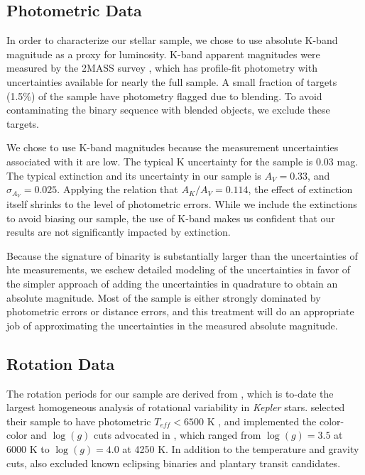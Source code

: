 \documentclass[manuscript]{aastex6}
\newcommand{\Kepler}{\mbox{\textit{Kepler}}}
\newcommand{\Teff}{\ensuremath{T_{eff}}}
\newcommand{\logg}{\ensuremath{\log(g)}}
\begin{document}
\subsection{Photometric Data}

In order to characterize our stellar sample, we chose to use absolute K-band
magnitude as a proxy for luminosity. K-band apparent magnitudes were measured
by the 2MASS survey \citep{Skrutskie06}, which has profile-fit photometry with 
uncertainties available for nearly the full sample. A small fraction of 
targets (1.5\%) of the \citet{McQuillan14} sample have photometry flagged due
to blending. To avoid contaminating the binary sequence with blended objects,
we exclude these targets.

We chose to use K-band magnitudes because the measurement uncertainties
associated with it are low. The typical K uncertainty for the
\citep{McQuillan14} sample is 0.03 mag. The typical extinction and its
uncertainty in our sample is \(A_V = 0.33\), and \(\sigma_{A_V}=0.025\).
Applying the \citet{Cardelli89} relation that \(A_K/A_V = 0.114\), the effect
of extinction itself shrinks to the level of photometric errors. While we
include the extinctions to avoid biasing our sample, the use of K-band makes us
confident that our results are not significantly impacted by extinction.

Because the signature of binarity is substantially larger than the
uncertainties of hte measurements, we eschew detailed modeling of the
uncertainties in favor of the simpler approach of adding the uncertainties in
quadrature to obtain an absolute magnitude. Most of the sample is either
strongly dominated by photometric errors or distance errors, and this treatment
will do an appropriate job of approximating the uncertainties in the measured
absolute magnitude.

\subsection{Rotation Data}

The rotation periods for our sample are derived from \citet{McQuillan14}, 
which is to-date the largest homogeneous analysis of rotational variability in
\Kepler{} stars. \citet{McQuillan14} selected their sample to have photometric
\(\Teff < 6500\) K \citep{Brown11,Dressing13}, and implemented the color-color
and \logg{} cuts advocated in \citet{Ciardi11}, which ranged from \(\logg = 
3.5\) at 6000 K to \(\logg = 4.0\) at 4250 K. 
In addition to the temperature and gravity cuts, \citet{McQuillan14} also 
excluded known eclipsing binaries and plantary transit candidates. 
\end{document}
